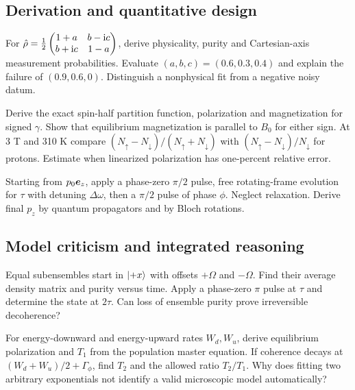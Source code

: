 \subsection{Derivation and quantitative design}
\begin{challengeproblem}
\label{prob:02:tomography}
For $\hat{\rho}=\tfrac12\begin{pmatrix}1+a&b-\mathrm{i} c\\b+\mathrm{i} c&1-a\end{pmatrix}$,
derive physicality, purity and Cartesian-axis measurement probabilities.
Evaluate $(a,b,c)=(0.6,0.3,0.4)$ and explain the failure of
$(0.9,0.6,0)$. Distinguish a nonphysical fit from a negative noisy datum.
\end{challengeproblem}
\begin{challengeproblem}
\label{prob:02:thermal}
Derive the exact spin-half partition function, polarization and magnetization
for signed $\gamma$. Show that equilibrium magnetization is parallel to
$B_0$ for either sign. At 3 T and 310 K compare
$(N_\uparrow-N_\downarrow)/(N_\uparrow+N_\downarrow)$ with
$(N_\uparrow-N_\downarrow)/N_\downarrow$ for protons.
Estimate when linearized polarization has one-percent relative error.
\end{challengeproblem}
\begin{challengeproblem}
\label{prob:02:ramsey}
Starting from $p_0\bm{e}_z$, apply a phase-zero $\pi/2$ pulse,
free rotating-frame evolution for $\tau$ with detuning $\Delta\omega$,
then a $\pi/2$ pulse of phase $\phi$. Neglect relaxation.
Derive final $p_z$ by quantum propagators and by Bloch rotations.
\end{challengeproblem}
\subsection{Model criticism and integrated reasoning}
\begin{challengeproblem}
\label{prob:02:dephase}
Equal subensembles start in $\lvert +x\rangle$ with offsets $+\Omega$ and
$-\Omega$. Find their average density matrix and purity versus time.
Apply a phase-zero $\pi$ pulse at $\tau$ and determine the state at
$2\tau$. Can loss of ensemble purity prove irreversible decoherence?
\end{challengeproblem}
\begin{challengeproblem}
\label{prob:02:rates}
For energy-downward and energy-upward rates $W_d,W_u$, derive equilibrium
polarization and $T_1$ from the population master equation.
If coherence decays at $(W_d+W_u)/2+\Gamma_\phi$, find $T_2$ and
the allowed ratio $T_2/T_1$. Why does fitting two arbitrary exponentials
not identify a valid microscopic model automatically?
\end{challengeproblem}
